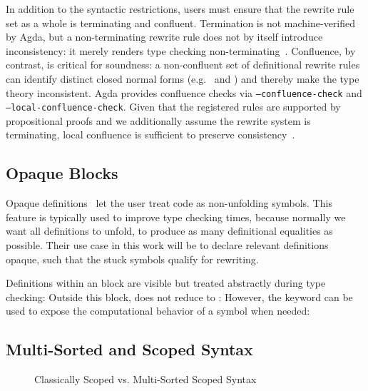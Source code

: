 \documentclass[a4paper,UKenglish,cleveref, autoref, thm-restate,anonymous]{lipics-v2021}
\begin{document}
In addition to the syntactic restrictions, users must ensure that the rewrite
rule set as a whole is terminating and confluent. Termination is not
machine-verified by Agda, but a non-terminating rewrite rule does not by itself
introduce inconsistency: it merely renders type checking
non-terminating~\cite{10.1145/3434341}. Confluence, by contrast, is critical
for soundness: a non-confluent set of definitional rewrite rules can identify
distinct closed normal forms (e.g.\  and
) and thereby make the type theory
inconsistent. Agda provides confluence checks via \texttt{--confluence-check}
and \texttt{--local-confluence-check}. Given that the registered rules are
supported by propositional proofs and we additionally assume the rewrite
system is terminating, local confluence is sufficient to preserve
consistency~\cite{10.1145/3434341}.

\subsection*{Opaque Blocks}
Opaque definitions~\cite{gratzer2022controlling} let the user treat code as
non-unfolding symbols. This feature is typically used to improve type checking
times, because normally we want all definitions to unfold, to produce as many
definitional equalities as possible. Their use case in this work will be to
declare relevant definitions opaque, such that the stuck symbols qualify for
rewriting.

Definitions within an  block are visible but treated
abstractly during type checking: \EOpaque{} Outside this block,
 does not reduce to : \EOpaqueExO{}
However, the  keyword can be used to expose the
computational behavior of a symbol when needed: \EOpaqueExT{}

\subsection{Multi-Sorted and Scoped Syntax}\label{sec:pre-syn}
\begin{figure}[t]
      \begin{minipage}[t]{0.45\linewidth}
            \raggedright{}
            \EScoped{}
      \end{minipage}
      \hfill
      \begin{minipage}[t]{0.55\linewidth}
            \raggedright{}
            \EMultiSorted{}
      \end{minipage}
      \caption{Classically Scoped vs. Multi-Sorted Scoped Syntax}\label{fig:pre-svm}
\end{figure}
\end{document}
